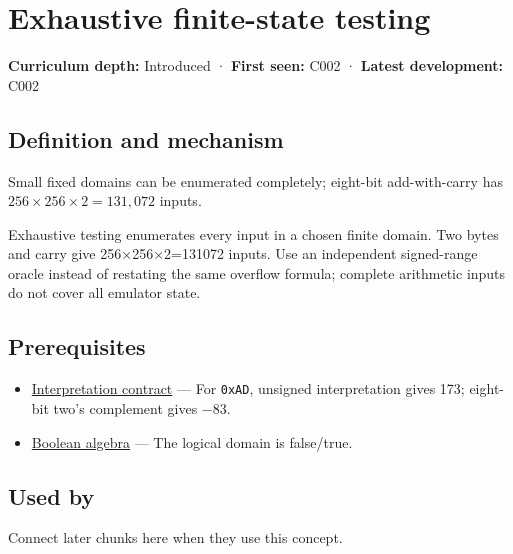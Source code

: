 \hypertarget{appendix-05db24ccc28a}{}\label{referencestart:appendix-05db24ccc28a}
\section{Exhaustive finite-state testing}\label{appendix-05db24ccc28a-exhaustive-finite-state-testing}

\textbf{Curriculum depth:} Introduced · \textbf{First seen:} C002 · \textbf{Latest development:} C002

\begin{allmightroledefinition}

\subsection{Definition and mechanism}\label{appendix-05db24ccc28a-definition-and-mechanism}

Small fixed domains can be enumerated completely; eight-bit add-with-carry has \(256\times256\times2=131{,}072\) inputs.

\end{allmightroledefinition}

Exhaustive testing enumerates every input in a chosen finite domain. Two bytes and carry give 256×256×2=131072 inputs. Use an independent signed-range oracle instead of restating the same overflow formula; complete arithmetic inputs do not cover all emulator state.

\subsection{Prerequisites}\label{appendix-05db24ccc28a-prerequisites}

\begin{itemize}
\tightlist
\item
  \hyperref[appendix-f414bd4ed05c]{Interpretation contract} --- For \texttt{0xAD}, unsigned interpretation gives 173; eight-bit two's complement gives −83.
\item
  \hyperref[appendix-24475e1596a8]{Boolean algebra} --- The logical domain is false/true.
\end{itemize}

\subsection{Used by}\label{appendix-05db24ccc28a-used-by}

Connect later chunks here when they use this concept.

